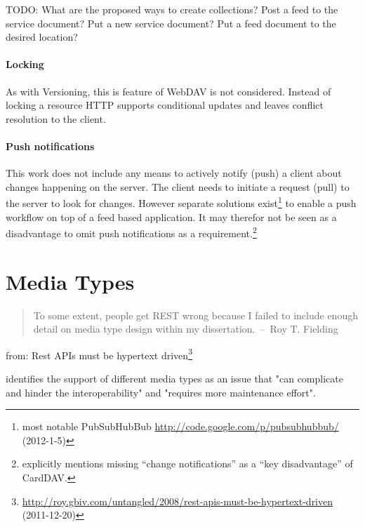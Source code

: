 \documentclass[12pt,a4paper]{scrartcl}		%
\newcommand{\citeurl}[2]{\url{#1} (#2)}
\begin{document}
TODO: What are the proposed ways to create collections?
Post a feed to the service document? Put a new service document? Put a feed document to the desired location?

\paragraph{Locking}
As with Versioning, this is feature of WebDAV is not considered. Instead of
locking a resource HTTP supports conditional updates and leaves conflict
resolution to the client.

\paragraph{Push notifications}
This work does not include any means to actively notify (push) a client about
changes happening on the server. The client needs to initiate a request (pull)
to the server to look for changes. However separate solutions exist\footnote{most
  notable PubSubHubBub
  \citeurl{http://code.google.com/p/pubsubhubbub/}{2012-1-5}} to enable a push
workflow on top of a feed based
application.\cite{Wilde:2009:FQP:1693155.1693220} It may therefor not be seen as a disadvantage to omit push notifications as a requirement.\footnote{\cite[sec. 1]{RFC6352} explicitly mentions missing ``change notifications'' as a ``key disadvantage'' of CardDAV.}


\section{Media Types}


\begin{quote}
  To some extent, people get REST wrong because I failed to include enough
  detail on media type design within my dissertation.~--~Roy T. Fielding
\end{quote}
from: Rest APIs must be hypertext driven\footnote
  {\citeurl{http://roy.gbiv.com/untangled/2008/rest-apis-must-be-hypertext-driven}{2011-12-20}}

\cite[sec. 7.2]{Pautasso:2008:RWS:1367497.1367606} identifies the support of different media types as an issue that "can complicate and hinder the interoperability" and "requires more maintenance effort".
\end{document}
